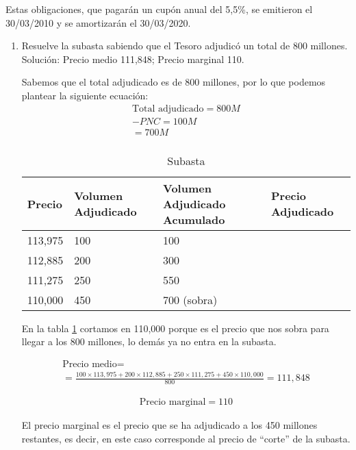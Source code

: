 Estas obligaciones, que pagarán un cupón anual del 5,5\%, se emitieron el 30/03/2010 y se amortizarán el 30/03/2020.

\begin{enumerate}[label=\textbf{\alph*)}]
    \item Resuelve la subasta sabiendo que el Tesoro adjudicó un total de 800 millones.\\
    Solución: Precio medio 111,848; Precio marginal 110.

    Sabemos que el total adjudicado es de 800 millones, por lo que podemos plantear la siguiente ecuación:
    \begin{align*}
        \text{Total adjudicado} = 800 M \\
        - PNC = 100 M \\
        = 700 M \\
    \end{align*}

    \begin{table}[h]
        \centering
        \begin{tabular}{p{2cm}p{2cm}p{2cm}p{2cm}}
            \toprule
            \textbf{Precio} & \textbf{Volumen Adjudicado} & \textbf{Volumen Adjudicado Acumulado} & \textbf{Precio Adjudicado}  \\
            \midrule
            113,975&100&100&\\
            112,885&200&300&\\
            111,275&250&550&\\
            110,000&450&700 (sobra)&\\
            \bottomrule
        \end{tabular}
        \caption{Subasta}
        \label{tab:subastaej7}
    \end{table}
    En la tabla \ref{tab:subastaej7} cortamos en 110,000 porque es el precio que nos sobra para llegar a los 800 millones, lo demás ya no entra en la subasta.

    \begin{align*}
        \text{Precio medio} = \\ = \frac{100 \times 113,975 + 200 \times 112,885 + 250 \times 111,275 + 450 \times 110,000}{800} = 111,848
    \end{align*}

    \begin{align*}
        \text{Precio marginal} = 110
    \end{align*}

    El precio marginal es el precio que se ha adjudicado a los 450 millones restantes, es decir, en este caso corresponde al precio de ``corte'' de la subasta.


\end{enumerate}

